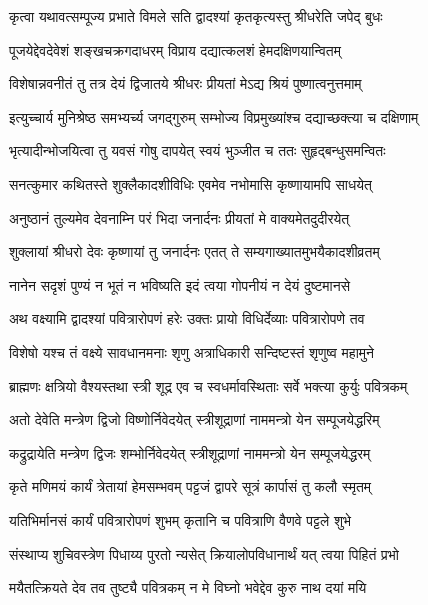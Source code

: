 \twolineshloka
{कृत्वा यथावत्सम्पूज्य प्रभाते विमले सति}
{द्वादश्यां कृतकृत्यस्तु श्रीधरेति जपेद् बुधः} %

\twolineshloka
{पूजयेद्देवदेवेशं शङ्खचक्रगदाधरम्}
{विप्राय दद्यात्कलशं हेमदक्षिणयान्वितम्} %

\twolineshloka
{विशेषान्नवनीतं तु तत्र देयं द्विजातये}
{श्रीधरः प्रीयतां मेऽद्य श्रियं पुष्णात्वनुत्तमाम्} %

\twolineshloka
{इत्युच्चार्य मुनिश्रेष्ठ समभ्यर्च्य जगद्गुरुम्}
{सम्भोज्य विप्रमुख्यांश्च दद्याच्छक्त्या च दक्षिणाम्} %

\twolineshloka
{भृत्यादीन्भोजयित्वा तु यवसं गोषु दापयेत्}
{स्वयं भुञ्जीत च ततः सुहृद्बन्धुसमन्वितः} %

\twolineshloka
{सनत्कुमार कथितस्ते शुक्लैकादशीविधिः}
{एवमेव नभोमासि कृष्णायामपि साधयेत्} %

\twolineshloka
{अनुष्ठानं तुल्यमेव देवनाम्नि परं भिदा}
{जनार्दनः प्रीयतां मे वाक्यमेतदुदीरयेत्} %

\twolineshloka
{शुक्लायां श्रीधरो देवः कृष्णायां तु जनार्दनः}
{एतत् ते सम्यगाख्यातमुभयैकादशीव्रतम्} %

\twolineshloka
{नानेन सदृशं पुण्यं न भूतं न भविष्यति}
{इदं त्वया गोपनीयं न देयं दुष्टमानसे} %


\twolineshloka
{अथ वक्ष्यामि द्वादश्यां पवित्रारोपणं हरेः}
{उक्तः प्रायो विधिर्देव्याः पवित्रारोपणे तव} %

\twolineshloka
{विशेषो यश्च तं वक्ष्ये सावधानमनाः शृणु}
{अत्राधिकारी सन्दिष्टस्तं शृणुष्व महामुने} %

\twolineshloka
{ब्राह्मणः क्षत्रियो वैश्यस्तथा स्त्री शूद्र एव च}
{स्वधर्मावस्थिताः सर्वे भक्त्या कुर्युः पवित्रकम्} %

\twolineshloka
{अतो देवेति मन्त्रेण द्विजो विष्णोर्निवेदयेत्}
{स्त्रीशूद्राणां नाममन्त्रो येन सम्पूजयेद्धरिम्} %

\twolineshloka
{कद्रुद्रायेति मन्त्रेण द्विजः शम्भोर्निवेदयेत्}
{स्त्रीशूद्राणां नाममन्त्रो येन सम्पूजयेद्धरम्} %

\twolineshloka
{कृते मणिमयं कार्यं त्रेतायां हेमसम्भवम्}
{पट्टजं द्वापरे सूत्रं कार्पासं तु कलौ स्मृतम्} %

\twolineshloka
{यतिभिर्मानसं कार्यं पवित्रारोपणं शुभम्}
{कृतानि च पवित्राणि वैणवे पट्टले शुभे} %

\twolineshloka
{संस्थाप्य शुचिवस्त्रेण पिधाय्य पुरतो न्यसेत्}
{क्रियालोपविधानार्थं यत् त्वया पिहितं प्रभो} %

\twolineshloka
{मयैतत्क्रियते देव तव तुष्ट्यै पवित्रकम्}
{न मे विघ्नो भवेद्देव कुरु नाथ दयां मयि} %

